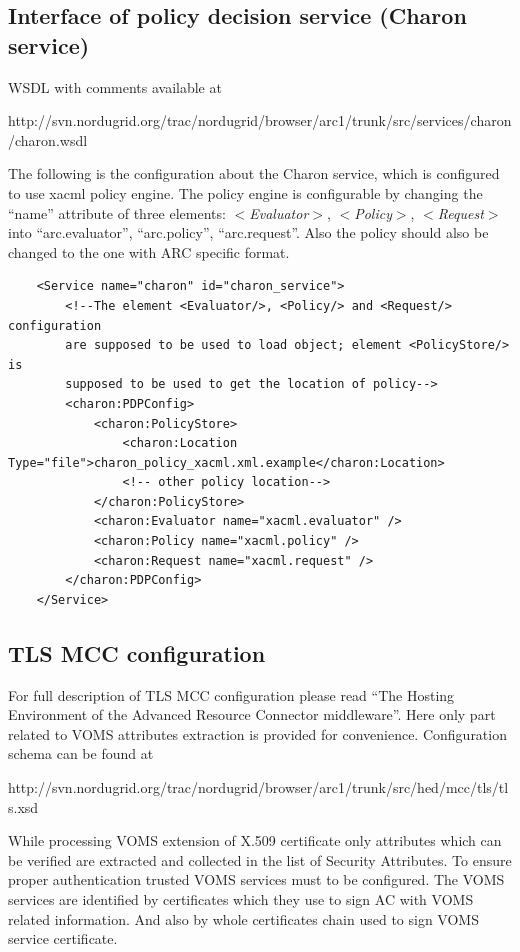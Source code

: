 \documentclass{article}                            %
\begin{document}
\subsection{Interface of policy decision service (Charon service)} %
\label{subsec:interface_pds}
WSDL with comments available at 

http://svn.nordugrid.org/trac/nordugrid/browser/arc1/trunk/src/services/charon/charon.wsdl

The following is the configuration about the Charon service, which is configured to use xacml policy engine. The policy engine is configurable by changing the ``name'' attribute of three elements: \textit{$<$Evaluator$>$}, \textit{$<$Policy$>$}, \textit{$<$Request$>$} into ``arc.evaluator'', ``arc.policy'', ``arc.request''. Also the policy should also be changed to the one with ARC specific format.

\begin{verbatim}
    <Service name="charon" id="charon_service">
        <!--The element <Evaluator/>, <Policy/> and <Request/> configuration
        are supposed to be used to load object; element <PolicyStore/> is
        supposed to be used to get the location of policy-->
        <charon:PDPConfig>
            <charon:PolicyStore>
                <charon:Location Type="file">charon_policy_xacml.xml.example</charon:Location>
                <!-- other policy location-->
            </charon:PolicyStore>
            <charon:Evaluator name="xacml.evaluator" />
            <charon:Policy name="xacml.policy" />
            <charon:Request name="xacml.request" />
        </charon:PDPConfig>
    </Service>
\end{verbatim}

\subsection{TLS MCC configuration} %
\label{subsec:tlsmcc_conf}
For full description of TLS MCC configuration please read ``The Hosting Environment of the Advanced Resource Connector middleware''. Here only part related to VOMS attributes extraction is provided for convenience. Configuration schema can be found at 

http://svn.nordugrid.org/trac/nordugrid/browser/arc1/trunk/src/hed/mcc/tls/tls.xsd

While processing VOMS extension of X.509 certificate only attributes which can be verified are extracted and collected in the list of Security Attributes. To ensure proper authentication trusted VOMS services must to be configured. The VOMS services are identified by certificates which they use to sign AC with VOMS related information. And also by whole certificates chain used to sign VOMS service certificate. 
\end{document}
